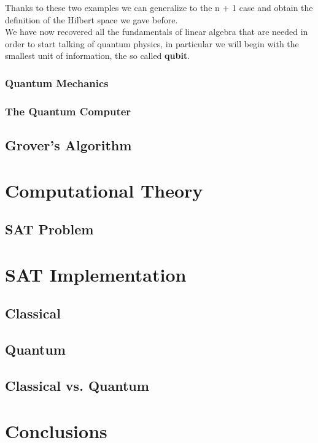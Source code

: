\documentclass[english]{article}
\begin{document}
			Thanks to these two examples we can generalize to the n + 1 case and obtain the definition of the Hilbert space we gave before. \\
			
			We have now recovered all the fundamentals of linear algebra that are needed in order to start talking of quantum physics, in particular we will begin with the smallest unit of information, the so called \textbf{qubit}.
						
			\subsubsection{Quantum Mechanics}
			\label{sec:quantumMechanics}
			
			
			
			\subsubsection{The Quantum Computer}
			\label{sec:quantumComputer}
			
		\subsection{Grover's Algorithm}
		\label{sec:grover}
		
	\section{Computational Theory}
	\label{sec:computationalTheory}
		\subsection{SAT Problem}
		\label{sec:sat}
		
	\section{SAT Implementation}
	\label{sec:satImpl}
		\subsection{Classical}
		\label{sec:satClassical}
		
		\subsection{Quantum}
		\label{sec:satQuantum}
		
		\subsection{Classical vs. Quantum}
		\label{sec:satCsatQ}
		
	\section{Conclusions}
	\label{sec:conclusions}
	
	\clearpage
	
	\nocite{*}
	
\end{document}
